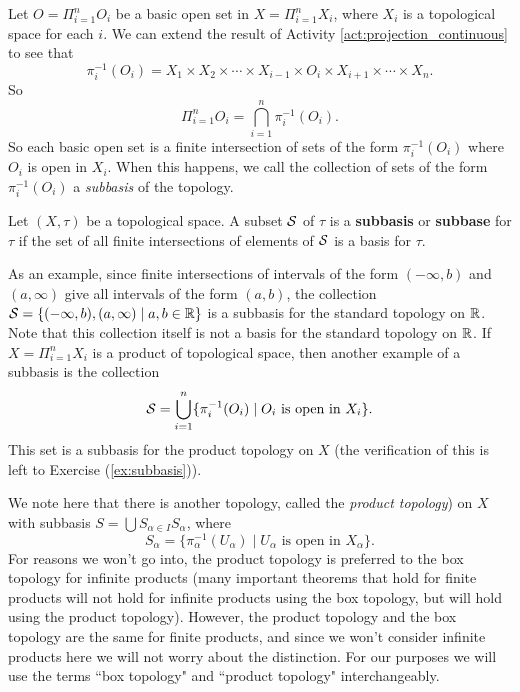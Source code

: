 Let $O = \Pi_{i=1}^n O_i$ be a basic open set in $X = \Pi_{i=1}^n X_i$, where $X_i$ is a topological space for each $i$. We can extend the result of Activity \ref{act:projection_continuous} to see that
\[\pi_i^{-1}(O_i) = X_1 \times X_2 \times \cdots \times X_{i-1} \times O_i \times X_{i+1} \times \cdots \times X_n.\]
So 
\[\Pi_{i=1}^n O_i = \bigcap_{i=1}^n \pi_i^{-1}(O_i).\]
So each basic open set is a finite intersection of sets of the form $\pi_i^{-1}(O_i)$ where $O_i$ is open in $X_i$. When this happens, we call the collection of sets of the form $\pi_i^{-1}(O_i)$ a \emph{subbasis} of the topology. 

\begin{definition} \label{def:subbasis} Let $(X, \tau)$ be a topological space. A subset $\mathcal{S}$ of $\tau$ is a \textbf{subbasis} or \textbf{subbase} for $\tau$ if the set of all finite intersections of elements of $\mathcal{S}$ is a basis for $\tau$. 
\end{definition}

As an example, since finite intersections of intervals of the form $(-\infty,b)$ and $(a, \infty)$ give all intervals of the form $(a,b)$, the collection $\mathcal{S} = \{(-\infty,b), (a, \infty) \mid a, b \in \mathbb{R}\}$ is a subbasis for the standard topology on $\mathbb{R}$. Note that this collection itself is not a basis for the standard topology on $\mathbb{R}$. If $X = \Pi_{i=1}^n X_i$ is a product of topological space, then another example of a subbasis is the collection
\[\mathcal{S} = \bigcup_{i=1}^n \{\pi_i^{-1}(O_i) \mid O_i \text{ is open in } X_i\}.\]
This set is a subbasis for the product topology on $X$ (the verification of this is left to Exercise (\ref{ex:subbasis})). 

We note here that there is another topology, called the \emph{product topology}) on $X$ with subbasis $S = \bigcup S_{\alpha \in I} S_{\alpha}$, where 
\[S_{\alpha} = \{\pi_{\alpha}^{-1}(U_{\alpha}) \mid U_{\alpha} \text{ is open in } X_{\alpha}\}.\] 
For reasons we won't go into, the product topology is preferred to the box topology for infinite products (many important theorems that hold for finite products will not hold for infinite products using the box topology, but will hold using the product topology). However, the product topology and the box topology are the same for finite products, and since we won't consider infinite products here we will not worry about the distinction. For our purposes we will use the terms ``box topology" and ``product topology" interchangeably.

